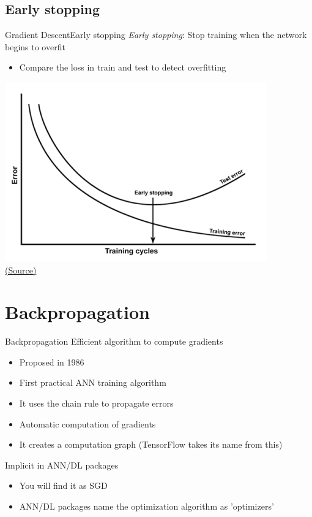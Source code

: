 \documentclass[10pt,compress]{beamer} %
\begin{document}
\subsection{Early stopping}
\begin{frame}{Gradient Descent}{Early stopping}
	\textit{Early stopping}: Stop training when the network begins to overfit
            \begin{itemize}
                \item Compare the loss in train and test to detect overfitting
            \end{itemize}

            \begin{center}
			\includegraphics[width=0.6\linewidth]{figs/validation.png}\\
			\scriptsize \href{https://datascience.stackexchange.com/questions/61/why-is-overfitting-bad-in-machine-learning}{(Source)}
            \end{center}
\end{frame}

\section{Backpropagation}
\begin{frame}{Backpropagation}
	Efficient algorithm to compute gradients
        \begin{itemize}
		\item Proposed in 1986
		\item First practical ANN training algorithm
                \item It uses the chain rule to propagate errors
		\item Automatic computation of gradients
		\item It creates a computation graph (TensorFlow takes its name from this)
        \end{itemize}

	Implicit in ANN/DL packages
	\begin{itemize}
		\item You will find it as SGD
		\item ANN/DL packages name the optimization algorithm as 'optimizers'
	\end{itemize}
\end{frame}
\end{document}
